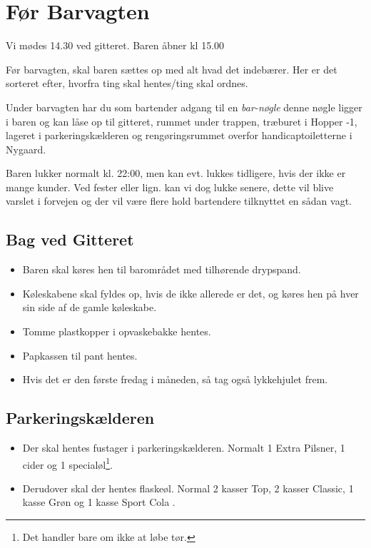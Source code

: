 \section{Før Barvagten}
\label{sec:pre-barvagten}

Vi mødes 14.30 ved gitteret. Baren åbner kl 15.00

Før barvagten, skal baren sættes op med alt hvad det indebærer. Her er
det sorteret efter, hvorfra ting skal hentes/ting skal ordnes.

Under barvagten har du som bartender adgang til en \textit{bar-nøgle} 
denne nøgle ligger i baren og kan låse op til gitteret, 
rummet under trappen, træburet i Hopper -1, 
lageret i parkeringskælderen og rengøringsrummet overfor handicaptoiletterne i Nygaard.

Baren lukker normalt kl. 22:00, men kan evt. lukkes tidligere, hvis der ikke er mange kunder.
Ved fester eller lign. kan vi dog lukke senere, dette vil blive varslet i forvejen og der vil 
være flere hold bartendere tilknyttet en sådan vagt.

\subsection{Bag ved Gitteret}
\label{sec:pre:bag-ved-gitteret}

\begin{itemize}
	\item Baren skal køres hen til barområdet med tilhørende drypspand.
	\item Køleskabene skal fyldes op, hvis de ikke allerede er det, 
	og køres hen på hver sin side af de gamle køleskabe.
	\item Tomme plastkopper i opvaskebakke hentes.
	\item Papkassen til pant hentes.
	\item Hvis det er den første fredag i måneden, så tag også lykkehjulet frem.
\end{itemize}

\subsection{Parkeringskælderen}
\label{sec:pre:hopper}

\begin{itemize}
	\item Der skal hentes fustager i parkeringskælderen. Normalt 1
		Extra Pilsner, 1 cider og 1 specialøl\footnote[1]{\label{note1}Det handler bare om ikke at løbe
		tør.}.
	\item Derudover skal der hentes flaskeøl. Normal 2 kasser Top, 2 kasser Classic, 1 kasse Grøn og 1 kasse Sport Cola \footnotemark[1].
\end{itemize}

